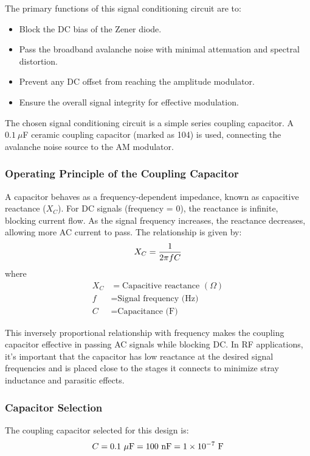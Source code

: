 \documentclass[12pt,a4paper]{report}
\begin{document}
	The primary functions of this signal conditioning circuit are to:
	\begin{itemize}
		\item Block the DC bias of the Zener diode.
		\item Pass the broadband avalanche noise with minimal attenuation and spectral distortion.
		\item Prevent any DC offset from reaching the amplitude modulator.
		\item Ensure the overall signal integrity for effective modulation.
	\end{itemize}
	
	The chosen signal conditioning circuit is a simple series coupling capacitor. A $0.1\ \mu$F ceramic coupling capacitor (marked as 104) is used, connecting the avalanche noise source to the AM modulator.
	\subsubsection{Operating Principle of the Coupling Capacitor}
	A capacitor behaves as a frequency-dependent impedance, known as capacitive reactance ($X_C$). For DC signals (frequency = 0), the reactance is infinite, blocking current flow. As the signal frequency increases, the reactance decreases, allowing more AC current to pass. The relationship is given by:
	\begingroup
	\setlength{\mathindent}{0pt}
	\begin{equation*}
		\hfill
		X_C = \frac{1}{2\pi fC}
		\hfill
	\end{equation*}
	\endgroup
	where
	\begin{align*}
		X_C &= \text{Capacitive reactance } (\Omega) \\
		f &= \text{Signal frequency (Hz)} \\
		C &= \text{Capacitance (F)}
	\end{align*}
	
	This inversely proportional relationship with frequency makes the coupling capacitor effective in passing AC signals while blocking DC. In RF applications, it's important that the capacitor has low reactance at the desired signal frequencies and is placed close to the stages it connects to minimize stray inductance and parasitic effects.
	
	\subsubsection{Capacitor Selection}
	The coupling capacitor selected for this design is:
	\begingroup
	\setlength{\mathindent}{0pt}
	\begin{equation*}
		\hfill
		C = 0.1\ \mu\text{F} = 100\ \text{nF} = 1 \times 10^{-7}\ \text{F}
		\hfill
	\end{equation*}
	\endgroup
	
\end{document}
